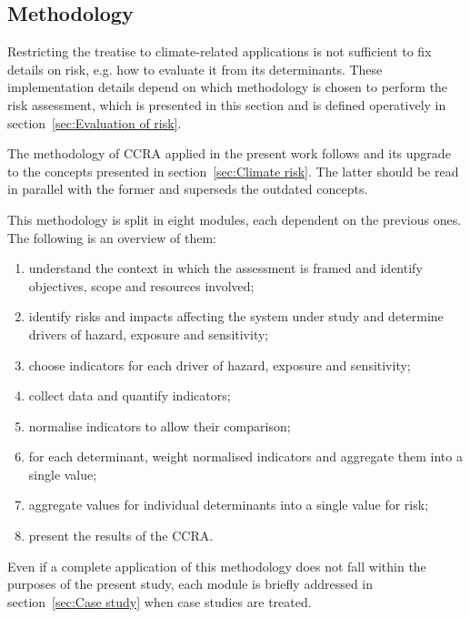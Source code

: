 \subsection{Methodology}
\label{sec:Methodology}
Restricting the treatise to climate-related applications is not sufficient to fix details on \gls{risk}, e.g. how to evaluate it from its \glspl{determinant}. These implementation details depend on which methodology is chosen to perform the risk assessment, which is presented in this section and is defined operatively in section~\ref{sec:Evaluation of risk}.

The methodology of \gls{CCRA} applied in the present work follows \cite{2017GIZTheVulnerability} and its upgrade \cite{2017GIZRiskSupplement} to the concepts presented in section~\ref{sec:Climate risk}. The latter should be read in parallel with the former and superseds the outdated concepts.

This methodology is split in eight modules, each dependent on the previous ones. The following is an overview of them:
\begin{enumerate}
  \item understand the context in which the assessment is framed and identify objectives, scope and resources involved;\cite[39-53]{2017GIZTheVulnerability}
  \item identify \glspl{risk} and \glspl{impact} affecting the system under study and determine \glspl{driver} of \gls{hazard}, \gls{exposure} and \gls{sensitivity};\cite[26-41]{2017GIZRiskSupplement}
  \item choose \glspl{indicator} for each \gls{driver} of \gls{hazard}, \gls{exposure} and \gls{sensitivity};\cite[73-84]{2017GIZTheVulnerability}
  \item collect data and quantify \glspl{indicator};\cite[87-103]{2017GIZTheVulnerability}
  \item normalise \glspl{indicator} to allow their comparison;\cite[105-119]{2017GIZTheVulnerability}
  \item for each \gls{determinant}, weight normalised \glspl{indicator} and aggregate them into a single value;\cite[121-131]{2017GIZTheVulnerability}
  \item aggregate values for individual \glspl{determinant} into a single value for \gls{risk};\cite[133-141]{2017GIZTheVulnerability}
  \item present the results of the \gls{CCRA}.\cite[143-154]{2017GIZTheVulnerability}
\end{enumerate}
Even if a complete application of this methodology does not fall within the purposes of the present study, each module is briefly addressed in section~\ref{sec:Case study} when case studies are treated.



